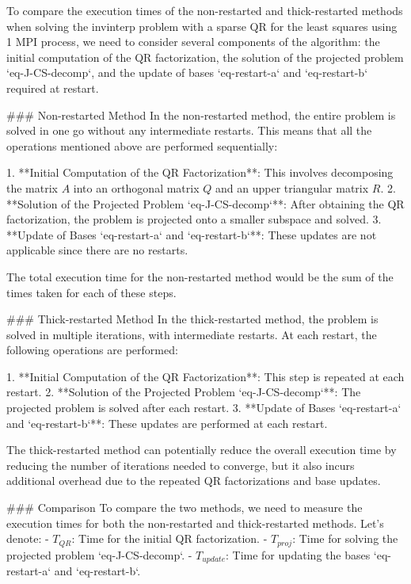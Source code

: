To compare the execution times of the non-restarted and thick-restarted methods when solving the invinterp problem with a sparse QR for the least squares using 1 MPI process, we need to consider several components of the algorithm: the initial computation of the QR factorization, the solution of the projected problem `eq-J-CS-decomp`, and the update of bases `eq-restart-a` and `eq-restart-b` required at restart.

### Non-restarted Method
In the non-restarted method, the entire problem is solved in one go without any intermediate restarts. This means that all the operations mentioned above are performed sequentially:

1. **Initial Computation of the QR Factorization**: This involves decomposing the matrix \( A \) into an orthogonal matrix \( Q \) and an upper triangular matrix \( R \).
2. **Solution of the Projected Problem `eq-J-CS-decomp`**: After obtaining the QR factorization, the problem is projected onto a smaller subspace and solved.
3. **Update of Bases `eq-restart-a` and `eq-restart-b`**: These updates are not applicable since there are no restarts.

The total execution time for the non-restarted method would be the sum of the times taken for each of these steps.

### Thick-restarted Method
In the thick-restarted method, the problem is solved in multiple iterations, with intermediate restarts. At each restart, the following operations are performed:

1. **Initial Computation of the QR Factorization**: This step is repeated at each restart.
2. **Solution of the Projected Problem `eq-J-CS-decomp`**: The projected problem is solved after each restart.
3. **Update of Bases `eq-restart-a` and `eq-restart-b`**: These updates are performed at each restart.

The thick-restarted method can potentially reduce the overall execution time by reducing the number of iterations needed to converge, but it also incurs additional overhead due to the repeated QR factorizations and base updates.

### Comparison
To compare the two methods, we need to measure the execution times for both the non-restarted and thick-restarted methods. Let's denote:
- \( T_{QR} \): Time for the initial QR factorization.
- \( T_{proj} \): Time for solving the projected problem `eq-J-CS-decomp`.
- \( T_{update} \): Time for updating the bases `eq-restart-a` and `eq-restart-b`.

